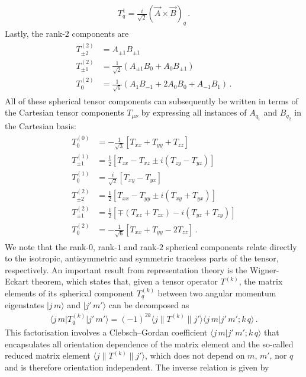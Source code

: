 \documentclass[../Thesis-IJspeert.tex]{subfiles}
\begin{document}
\begin{appendices}
\begin{align}
	T_q^{1}=\frac{i}{\sqrt{2}}(\vec{A}\times\vec{B})_q\,.
\end{align}
Lastly, the rank-$2$ components are
\begin{align}
\begin{split}
T_{\pm 2}^{(2)} &= A_{\pm 1}B_{\pm 1}\\
T_{\pm 1}^{(2)} &= \frac{1}{\sqrt{2}}(A_{\pm 1}B_{0}+A_{0}B_{\pm 1})\\
T_{0}^{(2)} &= \frac{1}{\sqrt{6}}(A_1B_{-1}+2A_0B_0+A_{-1}B_1)\,.
\end{split}
\end{align}
All of these spherical tensor components can subsequently be written in terms of the Cartesian tensor components $T_{\mu\nu}$ by expressing all instances of $A_{q_1}$ and $B_{q_2}$ in the Cartesian basis:
\begin{align}
\label{sphericalintermsofcartesian}
\begin{split}
T_0^{(0)}&=-\frac{1}{\sqrt{3}}\left[T_{xx}+T_{yy}+T_{zz}\right]\\
T_{\pm 1}^{(1)} &=\frac{1}{2}\left[T_{zx}-T_{xz}\pm i(T_{zy}-T_{yz})\right]\\
T_0^{(1)} &=\frac{i}{\sqrt{2}}\left[T_{xy}-T_{yx}\right]\\
T_{\pm 2}^{(2)} &= \frac{1}{2}\left[T_{xx}-T_{yy}\pm i (T_{xy}+T_{yx})\right]\\
T_{\pm 1}^{(2)} &= \frac{1}{2}\left[\mp (T_{xz}+T_{zx}) - i (T_{yz}+T_{zy})\right]\\
T_{0}^{(2)} &= -\frac{1}{\sqrt{6}}\left[T_{xx}+T_{yy}-2T_{zz}\right]\,.
\end{split}
\end{align}
We note that the rank-$0$, rank-$1$ and rank-$2$ spherical components relate directly to the isotropic, antisymmetric and symmetric traceless parts of the tensor, respectively. An important result from representation theory is the Wigner-Eckart theorem, which states that, given a tensor operator $T^{(k)}$, the matrix elements of its spherical component $T^{(k)}_q$ between two angular momentum eigenstates $\vert j\, m\rangle$ and $\vert j'\, m'\rangle$ can be decomposed as
\begin{align}
\label{wignereckart}
	\langle j\, m \vert  T^{(k)}_q \vert j'\, m' \rangle = (-1)^{2k}\langle j \| T^{(k)} \| j' \rangle \langle j\, m \vert j'\, m'; k\, q \rangle\,.
\end{align}
This factorisation involves a Clebsch–Gordan coefficient $\langle j\, m \vert j'\, m'; k\, q \rangle$ that encapsulates all orientation dependence of the matrix element and the so-called reduced matrix element $\langle j \| T^{(k)} \| j' \rangle$, which does not depend on $m$, $m′$, nor $q$ and is therefore orientation independent. The inverse relation is given by

\end{appendices}
\end{document}
